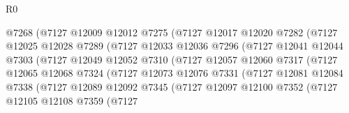 \begin{lexlean}{R0}
\begin{coremodule}
                            @7268
                            (@7127
                              @12009
                              @12012
                              @7275
                              (@7127
                                @12017
                                @12020
                                @7282
                                (@7127
                                  @12025
                                  @12028
                                  @7289
                                  (@7127
                                    @12033
                                    @12036
                                    @7296
                                    (@7127
                                      @12041
                                      @12044
                                      @7303
                                      (@7127
                                        @12049
                                        @12052
                                        @7310
                                        (@7127
                                          @12057
                                          @12060
                                          @7317
                                          (@7127
                                            @12065
                                            @12068
                                            @7324
                                            (@7127
                                              @12073
                                              @12076
                                              @7331
                                              (@7127
                                                @12081
                                                @12084
                                                @7338
                                                (@7127
                                                  @12089
                                                  @12092
                                                  @7345
                                                  (@7127
                                                    @12097
                                                    @12100
                                                    @7352
                                                    (@7127
                                                      @12105
                                                      @12108
                                                      @7359
                                                      (@7127

\end{coremodule}
\end{lexlean}
